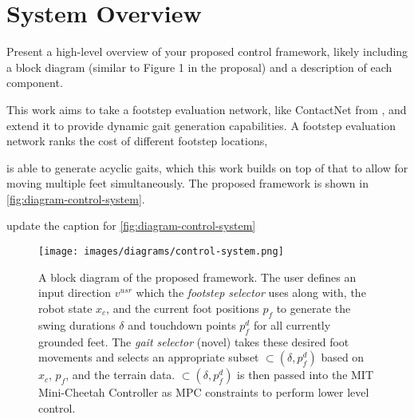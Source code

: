 \section{System Overview}

\begin{outline}
  Present a high-level overview of your proposed control framework,
  likely including a block diagram (similar to Figure 1 in the
  proposal) and a description of each component.
\end{outline}

This work aims to take a footstep evaluation network, like ContactNet
from \cite{bratta_contactnet_2024}, and
extend it to provide dynamic gait generation capabilities. A footstep
evaluation network
ranks the cost of different footstep locations,

is able to generate acyclic gaits, which this work builds on top of
that to allow for moving multiple feet simultaneously. The proposed
framework is shown in \autoref{fig:diagram-control-system}.

\begin{todo}
  update the caption for \autoref{fig:diagram-control-system}
\end{todo}

\begin{figure}
  \centering
  \texttt{[image: images/diagrams/control-system.png]}
  \caption{A block diagram of the proposed framework. The user
    defines an input direction $v^{usr}$ which the \textit{footstep
    selector} \cite{bratta_contactnet_2024} uses along with, the robot
    state $x_c$, and the current foot positions $p_f$ to generate the
    swing durations $\delta$ and touchdown points $p_f^d$ for all
    currently grounded feet. The \textit{gait selector} (novel) takes
    these desired foot movements and selects an appropriate subset
    $\subset(\delta,p_f^d)$ based on $x_c$, $p_f$, and the terrain
    data. $\subset(\delta,p_f^d)$ is then passed into the MIT
  Mini-Cheetah Controller as MPC constraints to perform lower level control.}
  \label{fig:diagram-control-system}
\end{figure}
